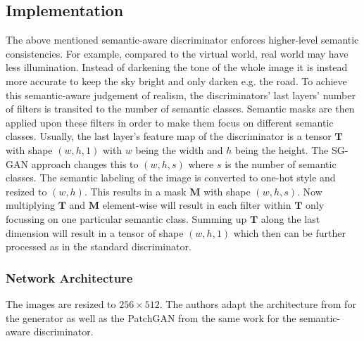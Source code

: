 \subsection{Implementation}
The above mentioned semantic-aware discriminator enforces higher-level semantic consistencies. For example, compared to the virtual world, real world may have less illumination. Instead of darkening the tone of the whole image it is instead more accurate to keep the sky bright and only darken e.g. the road. To achieve this semantic-aware judgement of realism, the discriminators' last layers' number of filters is transited to the number of semantic classes. Semantic masks are then applied upon these filters in order to make them focus on different semantic classes. Usually, the last layer's feature map of the discriminator is a tensor $\mathbf{T}$ with shape $(w,h,1)$ with $w$ being the width and $h$ being the height. The SG-GAN approach changes this to $(w,h,s)$ where $s$ is the number of semantic classes. The semantic labeling of the image is converted to one-hot style and resized to $(w,h)$. This results in a mask $\mathbf{M}$ with shape $(w,h,s)$. Now multiplying $\mathbf{T}$ and $\mathbf{M}$ element-wise will result in each filter within $\mathbf{T}$ only focussing on one particular semantic class. Summing up $\mathbf{T}$ along the last dimension will result in a tensor of shape $(w,h,1)$ which then can be further processed as in the standard discriminator. 

\subsubsection{Network Architecture}
The images are resized to $256 \times 512$. The authors adapt the architecture from \cite{DBLP:journals/corr/IsolaZZE16} for the generator as well as the PatchGAN from the same work for the semantic-aware discriminator. 


